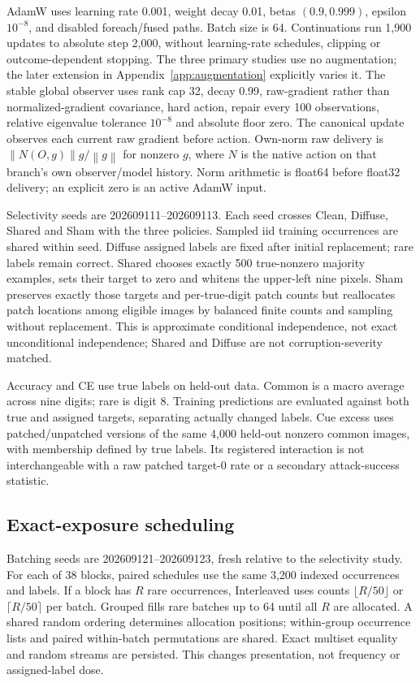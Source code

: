 \documentclass[10pt]{article}
\newcommand{\norm}[1]{\left\lVert#1\right\rVert}
\begin{document}
AdamW uses learning rate 0.001, weight decay 0.01, betas $(0.9,0.999)$, epsilon $10^{-8}$, and disabled foreach/fused paths. Batch size is 64. Continuations run 1,900 updates to absolute step 2,000, without learning-rate schedules, clipping or outcome-dependent stopping. The three primary studies use no augmentation; the later extension in Appendix~\ref{app:augmentation} explicitly varies it. The stable global observer uses rank cap 32, decay 0.99, raw-gradient rather than normalized-gradient covariance, hard action, repair every 100 observations, relative eigenvalue tolerance $10^{-8}$ and absolute floor zero. The canonical update observes each current raw gradient before action. Own-norm raw delivery is $\norm{N(O,g)}g/\norm{g}$ for nonzero $g$, where $N$ is the native action on that branch's own observer/model history. Norm arithmetic is float64 before float32 delivery; an explicit zero is an active AdamW input.

Selectivity seeds are 202609111--202609113. Each seed crosses Clean, Diffuse, Shared and Sham with the three policies. Sampled iid training occurrences are shared within seed. Diffuse assigned labels are fixed after initial replacement; rare labels remain correct. Shared chooses exactly 500 true-nonzero majority examples, sets their target to zero and whitens the upper-left nine pixels. Sham preserves exactly those targets and per-true-digit patch counts but reallocates patch locations among eligible images by balanced finite counts and sampling without replacement. This is approximate conditional independence, not exact unconditional independence; Shared and Diffuse are not corruption-severity matched.

Accuracy and CE use true labels on held-out data. Common is a macro average across nine digits; rare is digit 8. Training predictions are evaluated against both true and assigned targets, separating actually changed labels. Cue excess uses patched/unpatched versions of the same 4,000 held-out nonzero common images, with membership defined by true labels. Its registered interaction is not interchangeable with a raw patched target-0 rate or a secondary attack-success statistic.

\subsection{Exact-exposure scheduling}
Batching seeds are 202609121--202609123, fresh relative to the selectivity study. For each of 38 blocks, paired schedules use the same 3,200 indexed occurrences and labels. If a block has $R$ rare occurrences, Interleaved uses counts $\lfloor R/50\rfloor$ or $\lceil R/50\rceil$ per batch. Grouped fills rare batches up to 64 until all $R$ are allocated. A shared random ordering determines allocation positions; within-group occurrence lists and paired within-batch permutations are shared. Exact multiset equality and random streams are persisted. This changes presentation, not frequency or assigned-label dose.
\end{document}
